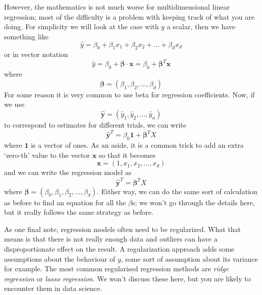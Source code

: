 \documentclass[12pt]{article}
\begin{document}
However, the mathematics is not much worse for multidimensional linear
regression; most of the difficulty is a problem with keeping track of
what you are doing. For simplicity we will look at the case with $y$ a scalar, then we have something like
\begin{equation}
  \hat{y}=\beta_0+\beta_1x_1+\beta_2x_2+\ldots+\beta_dx_d
\end{equation}
or in vector notation
\begin{equation}
  \hat{y}=\beta_0+\boldsymbol{\beta}\cdot\mathbf{x}=\beta_0+\boldsymbol{\beta}^T\mathbf{x}
\end{equation}
where
\begin{equation}
  \boldsymbol{\beta}=(\beta_1,\beta_2,\ldots,\beta_d)
\end{equation}
For some reason it is very common to use beta for regression
coefficients. Now, if we use
\begin{equation}
  \hat{\textbf{y}}=(\hat{y}_1,\hat{y}_2,\ldots,\hat{y}_n)
\end{equation}
to correspond to estimates for different trials, we can write
\begin{equation}
  \hat{\textbf{y}}^T=\beta_0\mathbf{1}+\boldsymbol{\beta}^TX
\end{equation}
where $\mathbf{1}$ is a vector of ones. As an aside, it is a common
trick to add an extra `zero-th' value to the vector $\mathbf{x}$ so
that it becomes
\begin{equation}
  \mathbf{x}=(1,x_1,x_2,\ldots,x_d)
\end{equation}
and we can write the regression model as
\begin{equation}
  \hat{\textbf{y}}^T=\boldsymbol{\beta}^TX
\end{equation}
where
$\boldsymbol{\beta}=(\beta_0,\beta_1,\beta_2,\ldots,\beta_d)$. Either
way, we can do the same sort of calculation as before to find an
equation for all the $\beta$s; we won't go through the details here,
but it really follows the same strategy as before.

As one final note, regression models often need to be
regularized. What that means is that there is not really enough data
and outliers can have a disproportionate effect on the result. A
regularization approach adds some assumptions about the behaviour of
$y$, some sort of assumption about its variance for example. The most
common regularised regression methods are \textsl{ridge regression} or
\textsl{lasso regression}. We won't discuss these here, but you are
likely to encounter them in data science.
\end{document}

